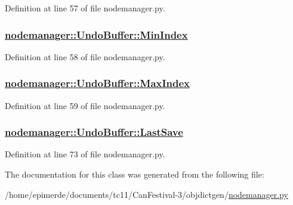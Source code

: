 Definition at line 57 of file nodemanager.py.\hypertarget{classnodemanager_1_1UndoBuffer_efcb3fd67a5a77e1cffe5ee2d6fb612d}{
\subsubsection[MinIndex]{\setlength{\rightskip}{0pt plus 5cm}\hyperlink{classnodemanager_1_1UndoBuffer_efcb3fd67a5a77e1cffe5ee2d6fb612d}{nodemanager::Undo\-Buffer::Min\-Index}}}
\label{classnodemanager_1_1UndoBuffer_efcb3fd67a5a77e1cffe5ee2d6fb612d}




Definition at line 58 of file nodemanager.py.\hypertarget{classnodemanager_1_1UndoBuffer_51d3531c9b7ab75b2a4d6a5f49ebc15e}{
\subsubsection[MaxIndex]{\setlength{\rightskip}{0pt plus 5cm}\hyperlink{classnodemanager_1_1UndoBuffer_51d3531c9b7ab75b2a4d6a5f49ebc15e}{nodemanager::Undo\-Buffer::Max\-Index}}}
\label{classnodemanager_1_1UndoBuffer_51d3531c9b7ab75b2a4d6a5f49ebc15e}




Definition at line 59 of file nodemanager.py.\hypertarget{classnodemanager_1_1UndoBuffer_abfc1f3adfc21d88b4382b410b9991d9}{
\subsubsection[LastSave]{\setlength{\rightskip}{0pt plus 5cm}\hyperlink{classnodemanager_1_1UndoBuffer_abfc1f3adfc21d88b4382b410b9991d9}{nodemanager::Undo\-Buffer::Last\-Save}}}
\label{classnodemanager_1_1UndoBuffer_abfc1f3adfc21d88b4382b410b9991d9}




Definition at line 73 of file nodemanager.py.

The documentation for this class was generated from the following file:\begin{CompactItemize}
\item 
/home/epimerde/documents/tc11/Can\-Festival-3/objdictgen/\hyperlink{nodemanager_8py}{nodemanager.py}\end{CompactItemize}
